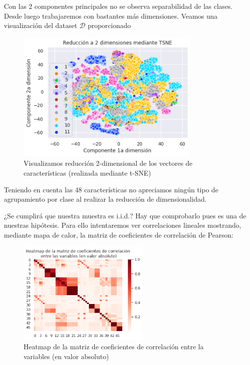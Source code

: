 \documentclass[11pt,a4paper]{article}
\theoremstyle{definition}
\begin{document}
	Con las 2 componentes principales no se observa separabilidad de las clases. Desde luego trabajaremos con bastantes más dimensiones.
	\fi
	\iffalse
	Veamos una visualización del dataset $\mathcal{D}$ proporcionado 
	\begin{figure}[H]
		\centering
		\includegraphics[width=0.8\textwidth]{images/class_tsne}
		\caption{Visualizamos reducción 2-dimensional de los vectores de características (realizada mediante t-SNE)}
	\end{figure}
	Teniendo en cuenta las 48 características no apreciamos ningún tipo de agrupamiento por clase al realizar la reducción de dimensionalidad.
	
	
	¿Se cumplirá que nuestra muestra es i.i.d.? Hay que comprobarlo pues es una de nuestras hipótesis. Para ello intentaremos ver correlaciones lineales mostrando, mediante mapa de calor, la matriz de coeficientes de correlación de Pearson:
	\begin{figure}[H]
		\centering
		\includegraphics[width=0.57\textwidth]{images/corr_matrix_heatmap}
		\caption{Heatmap de la matriz de coeficientes de correlación entre la variables (en valor absoluto)}
	\end{figure}
	
\end{document}
